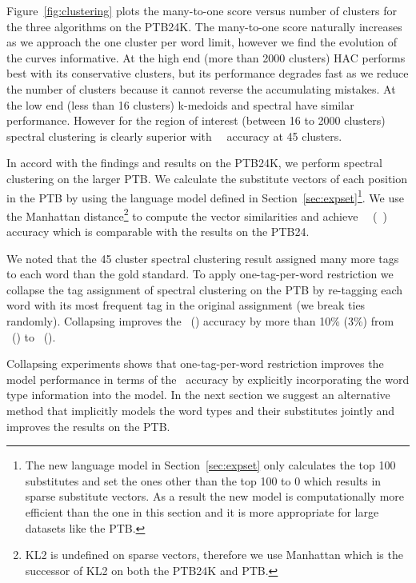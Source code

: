 Figure~\ref{fig:clustering} plots the many-to-one score versus number
of clusters for the three algorithms on the PTB24K.  The many-to-one
score naturally increases as we approach the one cluster per word
limit, however we find the evolution of the curves informative.  At
the high end (more than 2000 clusters) HAC performs best with its
conservative clusters, but its performance degrades fast as we reduce
the number of clusters because it cannot reverse the accumulating
mistakes.  At the low end (less than 16 clusters) k-medoids and
spectral have similar performance.  However for the region of interest
(between 16 to 2000 clusters) spectral clustering is clearly superior
with \spectralResult\ \mto\ accuracy at 45 clusters.

In accord with the findings and results on the PTB24K, we perform
spectral clustering on the larger PTB.  We calculate the substitute
vectors of each position in the PTB by using the language model
defined in Section~\ref{sec:expset}\footnote{The new language model in
  Section~\ref{sec:expset} only calculates the top 100 substitutes and
  set the ones other than the top 100 to 0 which results in sparse
  substitute vectors.  As a result the new model is computationally
  more efficient than the one in this section and it is more
  appropriate for large datasets like the PTB.}.  We use the Manhattan
distance\footnote{KL2 is undefined on sparse vectors, therefore we use
  Manhattan which is the successor of KL2 on both the PTB24K and PTB.}
to compute the vector similarities and achieve \spectralMtoPTB\ \mto\
 (\collapseVmPTB\ \vm) accuracy which is comparable with the results on
the PTB24.

We noted that the 45 cluster spectral clustering result assigned many
more tags to each word than the gold standard.  To apply
one-tag-per-word restriction we collapse the tag assignment of
spectral clustering on the PTB by re-tagging each word with its most
frequent tag in the original assignment (we break ties randomly).
Collapsing improves the \mto\ (\vm) accuracy by more than 10\% (3\%)
from \spectralMtoPTB\ (\spectralVmPTB) to \collapseMtoPTB\ (\collapseVmPTB).

Collapsing experiments shows that one-tag-per-word restriction
improves the model performance in terms of the \mto\ accuracy by
explicitly incorporating the word type information into the model.  In
the next section we suggest an alternative method that implicitly
models the word types and their substitutes jointly and improves the
results on the PTB.




